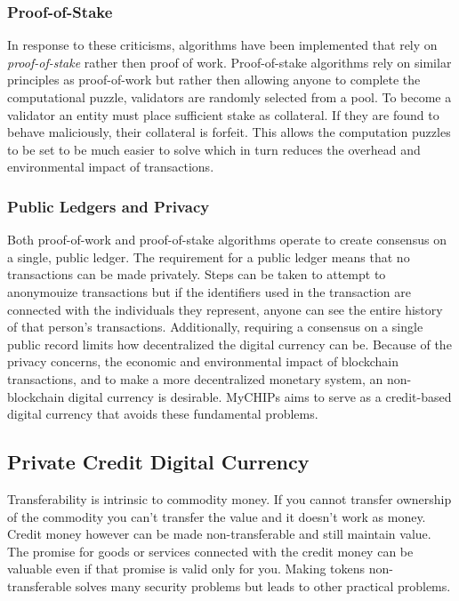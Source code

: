 \documentclass[runningheads]{llncs}
\begin{document}
\subsubsection{Proof-of-Stake}
In response to these criticisms, algorithms have been implemented that rely on \emph{proof-of-stake} rather then proof of work. Proof-of-stake algorithms rely on similar principles as proof-of-work but rather then allowing anyone to complete the computational puzzle, validators are randomly selected from a pool. To become a validator an entity must place sufficient stake as collateral. If they are found to behave maliciously, their collateral is forfeit. This allows the computation puzzles to be set to be much easier to solve which in turn reduces the overhead and environmental impact of transactions.

\subsubsection{Public Ledgers and Privacy}
Both proof-of-work and proof-of-stake algorithms operate to create consensus on a single, public ledger. The requirement for a public ledger means that no transactions can be made privately. Steps can be taken to attempt to anonymouize transactions but if the identifiers used in the transaction are connected with the individuals they represent, anyone can see the entire history of that person's transactions. Additionally, requiring a consensus on a single public record limits how decentralized the digital currency can be. Because of the privacy concerns, the economic and environmental impact of blockchain transactions, and to make a more decentralized monetary system, an non-blockchain digital currency is desirable. MyCHIPs aims to serve as a credit-based digital currency that avoids these fundamental problems. 

\subsection{Private Credit Digital Currency}

Transferability is intrinsic to commodity money. If you cannot transfer ownership of the commodity you can't transfer the value and it doesn't work as money. Credit money however can be made non-transferable and still maintain value. The promise for goods or services connected with the credit money can be valuable even if that promise is valid only for you. Making tokens non-transferable solves many security problems but leads to other practical problems.
\end{document}
